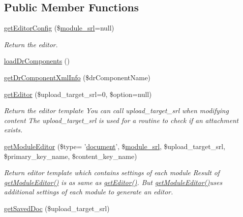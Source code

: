 \subsection*{Public Member Functions}
\begin{DoxyCompactItemize}
\item 
\hyperlink{classeditorModel_a66f732bbdd500d31fb39fd03eb8d46b5}{get\+Editor\+Config} (\$\hyperlink{ko_8install_8php_a370bb6450fab1da3e0ed9f484a38b761}{module\+\_\+srl}=null)
\begin{DoxyCompactList}\small\item\em Return the editor. \end{DoxyCompactList}\item 
\hyperlink{classeditorModel_a1ad866d4c1ab454b9d0b72c8d3cc29bd}{load\+Dr\+Components} ()
\item 
\hyperlink{classeditorModel_a580e31ed0fff869a97d5fe598975e960}{get\+Dr\+Component\+Xml\+Info} (\$dr\+Component\+Name)
\item 
\hyperlink{classeditorModel_a77477c0a6d333b3230f77904d96d93c5}{get\+Editor} (\$upload\+\_\+target\+\_\+srl=0, \$option=null)
\begin{DoxyCompactList}\small\item\em Return the editor template You can call upload\+\_\+target\+\_\+srl when modifying content The upload\+\_\+target\+\_\+srl is used for a routine to check if an attachment exists. \end{DoxyCompactList}\item 
\hyperlink{classeditorModel_a7870d2a76cbc33a9dbaea3f865edd313}{get\+Module\+Editor} (\$type= '\hyperlink{classdocument}{document}', \$\hyperlink{ko_8install_8php_a370bb6450fab1da3e0ed9f484a38b761}{module\+\_\+srl}, \$upload\+\_\+target\+\_\+srl, \$primary\+\_\+key\+\_\+name, \$content\+\_\+key\+\_\+name)
\begin{DoxyCompactList}\small\item\em Return editor template which contains settings of each module Result of \hyperlink{classeditorModel_a7870d2a76cbc33a9dbaea3f865edd313}{get\+Module\+Editor()} is as same as \hyperlink{classeditorModel_a77477c0a6d333b3230f77904d96d93c5}{get\+Editor()}. But \hyperlink{classeditorModel_a7870d2a76cbc33a9dbaea3f865edd313}{get\+Module\+Editor()}uses additional settings of each module to generate an editor. \end{DoxyCompactList}\item 
\hyperlink{classeditorModel_af9c4c2f7ba2d377b087cac08412b0baa}{get\+Saved\+Doc} (\$upload\+\_\+target\+\_\+srl)

\end{DoxyCompactItemize}
